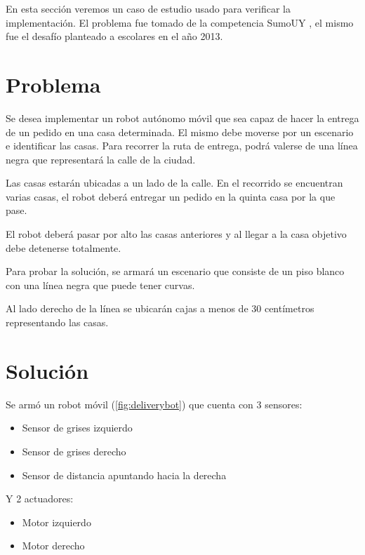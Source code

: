 
  En esta sección veremos un caso de estudio usado para verificar la
implementación.
  El problema fue tomado de la competencia SumoUY \cite{sumouy}, el mismo
fue el desafío planteado a escolares en el año 2013.

\section {Problema}

  Se desea implementar un robot autónomo móvil que sea capaz de
hacer la entrega de un pedido en una casa determinada.
  El mismo debe moverse por un escenario e identificar las casas.
  Para recorrer la ruta de entrega, podrá valerse de una línea negra
que representará la calle de la ciudad.

  Las casas estarán ubicadas a un lado de la calle. En el recorrido
se encuentran varias casas, el robot deberá entregar un pedido
en la quinta casa por la que pase.

  El robot deberá pasar por alto las casas anteriores y
al llegar a la casa objetivo debe detenerse totalmente.

  Para probar la solución, se armará un escenario que consiste de
un piso blanco con una línea negra que puede tener curvas.

  Al lado derecho de la línea se ubicarán cajas a menos de 30
centímetros representando las casas.

\section {Solución}

Se armó un robot móvil (\ref{fig:deliverybot}) que cuenta con 3 sensores:

\begin{itemize}
\item Sensor de grises izquierdo
\item Sensor de grises derecho
\item Sensor de distancia apuntando hacia la derecha
\end{itemize}

  Y 2 actuadores:

\begin{itemize}
\item Motor izquierdo
\item Motor derecho 
\end{itemize}

